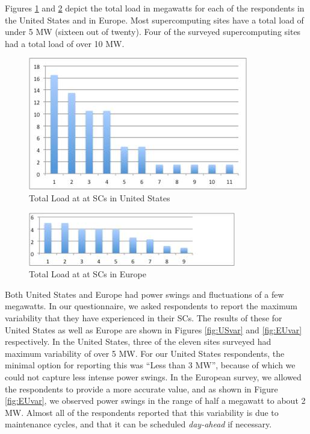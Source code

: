 \documentclass{article}
\begin{document}
Figures \ref{fig:USload} and \ref{fig:EUload} depict the total load in megawatts for each of the respondents in the United States and in Europe. Most supercomputing sites have a total load of under 5 MW (sixteen out of twenty). Four of the surveyed supercomputing sites had a total load of over 10 MW. 
\begin{figure}
\begin{center}
\includegraphics[scale=0.7]{figs/USLoad.jpg}
\caption{Total Load at at SCs in United States}
\label{fig:USload}
\end{center}
\end{figure}

\begin{figure}
\begin{center}
\includegraphics[scale=1]{figs/EULoad.jpg}
\caption{Total Load at at SCs in Europe}
\label{fig:EUload}
\end{center}
\end{figure}

Both United States and Europe had power swings and fluctuations of a few megawatts. In our questionnaire, we asked respondents to report the maximum variability that they have experienced in their SCs. The results of these for United States as well as Europe are shown in Figures \ref{fig:USvar} and \ref{fig:EUvar} respectively. In the United States, three of the eleven sites surveyed had maximum variability of over 5 MW. For our United States respondents, the minimal option for reporting this was ``Less than 3 MW'', because of which we could not capture less intense power swings. In the European survey, we allowed the respondents to provide a more accurate value, and as shown in Figure \ref{fig:EUvar}, we observed power swings in the range of half a megawatt to about 2 MW. Almost all of the respondents reported that this variability is due to maintenance cycles, and that it can be scheduled \emph{day-ahead} if necessary.
\end{document}
